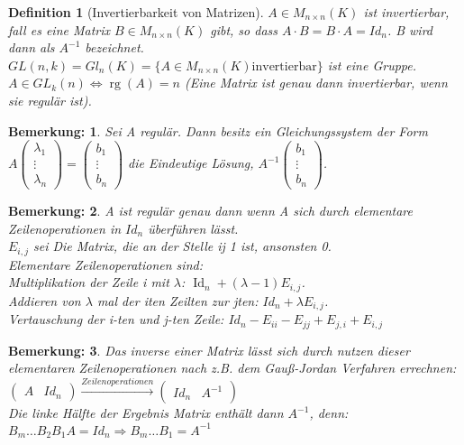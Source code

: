 \documentclass{report}
\newcommand{\lb}{\lambda}
\newcommand{\ve}[1]{{\begin{pmatrix}#1 \end{pmatrix}}}
\renewcommand{\v}{\ve}
\DeclareMathOperator{\rg}{rg}
\DeclareMathOperator{\Id}{Id}
\theoremstyle{customrem}
\newtheorem*{bemerkung}{Bemerkung\textnormal:}
\theoremstyle{customdef}
\newtheorem{definition}{Definition}[chapter]
\theoremstyle{customenv}
\begin{document}
\begin{definition}[Invertierbarkeit von Matrizen]
  \(A \in M_{n\times n}(K)\) ist invertierbar, fall es eine Matrix
  \(B \in M_{n\times n}(K)\) gibt, so dass \(A \cdot B = B \cdot A = Id_n\).
  B wird dann als \(A^{-1}\) bezeichnet.\\
  \(GL(n, k) = Gl_n(K) = \{A \in M_{n\times n}(K) \text{invertierbar}\}\) ist
  eine Gruppe.\\
  \(A \in GL_k(n) \Leftrightarrow \rg(A) = n\) (Eine Matrix ist genau dann
  invertierbar, wenn sie regul\"ar ist).
\end{definition}

\begin{bemerkung}
  Sei A regul\"ar. Dann besitz ein Gleichungssystem der Form
  \(A \v{\lb_1\\ \vdots \\ \lb_n} = \v{b_1 \\ \vdots \\ b_n}\) die Eindeutige
  L\"osung, \(A^{-1} \v{b_1 \\ \vdots \\ b_n}\).
\end{bemerkung}

\begin{bemerkung}
  A ist regul\"ar genau dann wenn A sich durch elementare Zeilenoperationen in
  \(Id_n\) \"uberf\"uhren l\"asst.\\
  \(E_{i,j}\) sei Die Matrix, die an der Stelle ij 1 ist, ansonsten 0.\\
  Elementare Zeilenoperationen sind:\\
  Multiplikation der Zeile i mit \(\lb\): \(\Id_n + (\lb  -1) E_{i,j}\).\\
  Addieren von \(\lb\) mal der iten Zeilten zur jten: \(Id_n + \lb E_{i,j}\).\\
  Vertauschung der i-ten und j-ten Zeile: \(Id_n - E_{ii} - E_{jj} + E_{j,i} + E_{i,j}\)\\
\end{bemerkung}

\begin{bemerkung}
Das inverse einer Matrix l\"asst sich durch nutzen dieser elementaren
Zeilenoperationen nach z.B. dem Gau\ss{}-Jordan Verfahren errechnen:\\
\(
  \left(
  \begin{array}{c|c}
    A & Id_n
  \end{array}
  \right)
  \overset{Zeilenoperationen}{\to}
  \left(
  \begin{array}{c|c}
  Id_n & A^{-1}
    \end{array}
  \right)
\)\\
Die linke H\"alfte der Ergebnis Matrix enth\"alt dann \(A^{-1}\), denn:\\
\(
B_m \dots B_2 B_1 A = Id_n \Rightarrow B_m \dots B_1 = A^{-1}
\)
\end{bemerkung}
\end{document}
